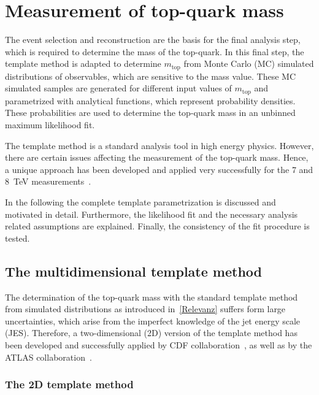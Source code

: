 \chapter{Measurement of top-quark mass}
\label{sec:Temp1}

The event selection and \rm reconstruction are the basis for the final analysis step, which is required to determine the mass of the top-quark. In this final step, the template method  is adapted to determine $m_{\text{top}}$  from Monte Carlo (MC) simulated distributions of observables, which are sensitive to the mass value. These MC simulated samples are generated for different input values of $m_{\text{top}}$ and parametrized with analytical functions, which represent probability densities. These probabilities are used to determine the top-quark mass in an unbinned maximum likelihood fit.

 The template method is a standard analysis tool in high energy physics. However, there are certain issues affecting the measurement of the top-quark mass.  Hence, a unique approach has been developed and applied very successfully for the 7 and 8~TeV measurements~\cite{Aad:2015nba,ATLAS-CONF-2017-071}.

In the following the complete template parametrization is discussed and motivated in detail. Furthermore, the likelihood fit and the necessary analysis related assumptions are explained. Finally, the consistency of the fit procedure is tested. 


\section{The multidimensional template method}



The determination of the top-quark mass with the standard template method from simulated distributions as introduced in~\cref{Relevanz}  suffers form large uncertainties, which arise from the imperfect knowledge of the jet energy scale (JES). 
Therefore, a two-dimensional (2D) version of the template method has been developed and successfully applied  by CDF collaboration~\cite{Aaltonen:2011dr}, as well as by the ATLAS collaboration~\cite{ATLAS:2012aj}.

\subsection{ The 2D template method}

